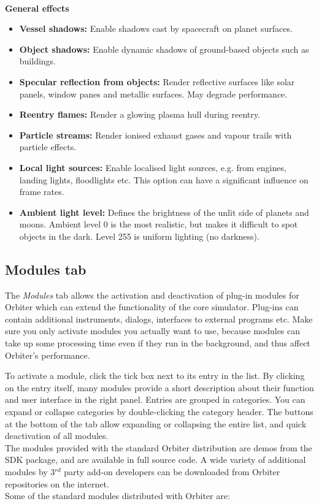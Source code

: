 \documentclass[Orbiter User Manual.tex]{subfiles}
\begin{document}
\noindent
\\
\textbf{General effects}

\begin{itemize}
\item \textbf{Vessel shadows:} Enable shadows cast by spacecraft on planet surfaces.
\item \textbf{Object shadows:} Enable dynamic shadows of ground-based objects such as buildings.
\item \textbf{Specular reflection from objects:} Render reflective surfaces like solar panels, window panes and metallic surfaces. May degrade performance.
\item \textbf{Reentry flames:} Render a glowing plasma hull during reentry.
\item \textbf{Particle streams:} Render ionised exhaust gases and vapour trails with particle effects.
\item \textbf{Local light sources:} Enable localised light sources, e.g. from engines, landing lights, floodlights etc. This option can have a significant influence on frame rates.
\item \textbf{Ambient light level:} Defines the brightness of the unlit side of planets and moons. Ambient level 0 is the most realistic, but makes it difficult to spot objects in the dark. Level 255 is uniform lighting (no darkness).
\end{itemize}


\subsection{Modules tab}
The \textit{Modules} tab allows the activation and deactivation of plug-in modules for Orbiter which can extend the functionality of the core simulator. Plug-ins can contain additional instruments, dialogs, interfaces to external programs etc. Make sure you only activate modules you actually want to use, because modules can take up some processing time even if they run in the background, and thus affect Orbiter’s performance.

\begin{figure}[H]
	\centering
\end{figure}

\noindent
To activate a module, click the tick box next to its entry in the list. By clicking on the entry itself, many modules provide a short description about their function and user interface in the right panel. Entries are grouped in categories. You can expand or collapse categories by double-clicking the category header. The buttons at the bottom of the tab allow expanding or collapsing the entire list, and quick deactivation of all modules.\\
The modules provided with the standard Orbiter distribution are demos from the SDK package, and are available in full source code. A wide variety of additional modules by 3$^{rd}$ party add-on developers can be downloaded from Orbiter repositories on the internet.\\
Some of the standard modules distributed with Orbiter are:
\end{document}
